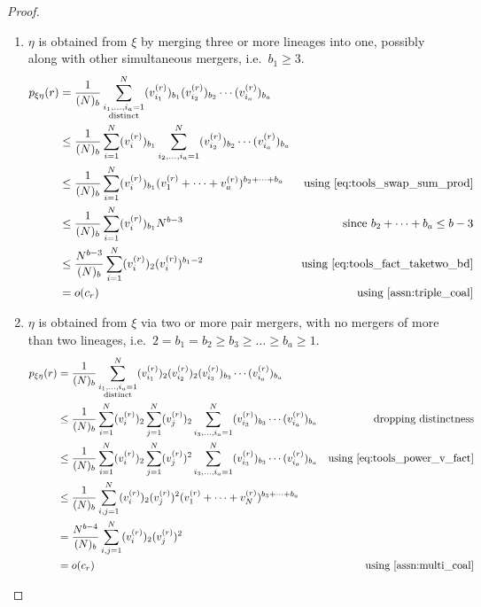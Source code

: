 \documentclass{article}
\begin{document}
\begin{proof}
\begin{enumerate}[label = \textbf{Case \arabic*.}]
\item\label{case:triple_merge} $\eta$ is obtained from $\xi$ by merging three or more lineages into one, possibly along with other simultaneous mergers, i.e.\ $b_1\geq3$.
\begin{align}
p_{\xi\eta}(r) &= \frac{1}{(N)_b} \sum_{\substack{i_1,\dots,i_a =1 \\ \text{distinct}}}^{N} (v_{i_1}^{(r)})_{b_1}(v_{i_2}^{(r)})_{b_2}\cdots (v_{i_a}^{(r)})_{b_a} &\notag\\
&\leq \frac{1}{(N)_b} \sum_{i=1}^{N} (v_{i}^{(r)})_{b_1} \sum_{i_2,\dots,i_a =1}^{N} (v_{i_2}^{(r)})_{b_2}\cdots (v_{i_a}^{(r)})_{b_a} &\notag\\
&\leq \frac{1}{(N)_b} \sum_{i=1}^{N} (v_{i}^{(r)})_{b_1} (v_1^{(r)}+\dots+v_a^{(r)})^{b_2+\dots+b_a} &\text{using \eqref{eq:tools_swap_sum_prod}} \notag\\
&\leq \frac{1}{(N)_b} \sum_{i=1}^{N} (v_{i}^{(r)})_{b_1} N^{b-3} &\text{since }b_2+\dots+b_a\leq b-3 \label{eq:triplemerge_bound_spinoff}\\
&\leq \frac{N^{b-3}}{(N)_b} \sum_{i=1}^{N} (v_{i}^{(r)})_{2}(v_{i}^{(r)})^{b_1-2}  &\text{using \eqref{eq:tools_fact_taketwo_bd}} \notag\\
&= o(c_r) &\text{using \ref{assn:triple_coal}} \notag
\end{align}

\item\label{case:multi_merge} $\eta$ is obtained from $\xi$ via two or more pair mergers, with no mergers of more than two lineages, i.e.\ $2=b_1=b_2\geq b_3\geq\dots\geq b_a\geq1$.
\begin{align}
p_{\xi\eta}(r) &= \frac{1}{(N)_b} \sum_{\substack{i_1,\dots,i_a =1 \\ \text{distinct}}}^{N} (v_{i_1}^{(r)})_2 (v_{i_2}^{(r)})_2 (v_{i_3}^{(r)})_{b_3}\cdots (v_{i_a}^{(r)})_{b_a} &\notag\\
&\leq \frac{1}{(N)_b} \sum_{i=1}^{N} (v_{i}^{(r)})_2 \sum_{j=1}^N (v_j^{(r)})_2 \sum_{i_3,\dots,i_a =1}^{N} (v_{i_3}^{(r)})_{b_3}\cdots (v_{i_a}^{(r)})_{b_a} &\text{dropping distinctness}\notag\\
&\leq \frac{1}{(N)_b} \sum_{i=1}^{N} (v_{i}^{(r)})_2 \sum_{j=1}^N (v_j^{(r)})^2 \sum_{i_3,\dots,i_a =1}^{N} (v_{i_3}^{(r)})_{b_3}\cdots (v_{i_a}^{(r)})_{b_a} &\text{using \eqref{eq:tools_power_v_fact}} \notag\\
&\leq \frac{1}{(N)_b} \sum_{i,j=1}^{N} (v_{i}^{(r)})_2 (v_j^{(r)})^2 (v_1^{(r)}+\dots+v_N^{(r)})^{b_3+\dots +b_a} &\notag\\
&=\frac{N^{b-4}}{(N)_b} \sum_{i,j=1}^N (v_{i}^{(r)})_2 (v_j^{(r)})^2 & \\
&= o(c_r) &\text{using \ref{assn:multi_coal}} \notag
\end{align}


\end{enumerate}
\end{proof}
\end{document}
